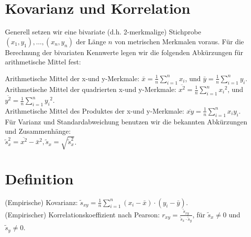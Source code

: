 \documentclass[10pt]{article}
\begin{document}
\section*{Kovarianz und Korrelation}
Generell setzen wir eine bivariate (d.h. 2-merkmalige) Stichprobe $\left(x_{1}, y_{1}\right), \ldots,\left(x_{n}, y_{n}\right)$ der Länge $n$ von metrischen Merkmalen voraus. Für die Berechnung der bivariaten Kennwerte legen wir die folgenden Abkürzungen für arithmetische Mittel fest:

Arithmetische Mittel der x-und y-Merkmale: $\bar{x}=\frac{1}{n} \sum_{i=1}^{n} x_{i}$, und $\bar{y}=\frac{1}{n} \sum_{i=1}^{n} y_{i}$.\\
Arithmetische Mittel der quadrierten x-und y-Merkmale: $\overline{x^{2}}=\frac{1}{n} \sum_{i=1}^{n} x_{i}{ }^{2}$, und $\overline{y^{2}}=\frac{1}{n} \sum_{i=1}^{n} y_{i}{ }^{2}$.\\
Arithmetische Mittel des Produktes der x-und y-Merkmale: $\overline{x y}=\frac{1}{n} \sum_{i=1}^{n} x_{i} y_{i}$.\\
Für Varianz und Standardabweichung benutzen wir die bekannten Abkürzungen und Zusammenhänge:\\
$\tilde{s}_{x}^{2}=\overline{x^{2}}-\bar{x}^{2}, \tilde{s}_{x}=\sqrt{\tilde{s}_{x}^{2}}$.

\section*{Definition}
(Empirische) Kovarianz: $\tilde{s}_{x y}=\frac{1}{n} \sum_{i=1}^{n}\left(x_{i}-\bar{x}\right) \cdot\left(y_{i}-\bar{y}\right)$.\\
(Empirischer) Korrelationskoeffizient nach Pearson: $r_{x y}=\frac{\tilde{s}_{x y}}{\tilde{s}_{x} \cdot \tilde{s}_{y}}$, für $\tilde{s}_{x} \neq 0$ und $\tilde{s}_{y} \neq 0$.
\end{document}
